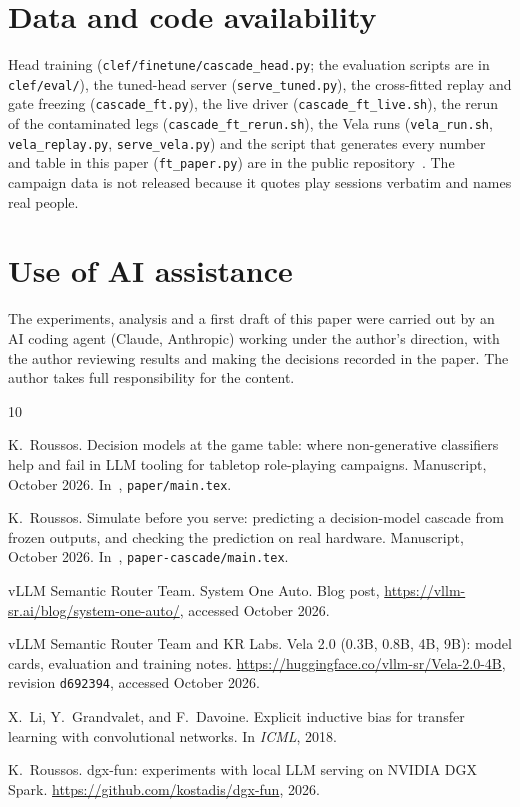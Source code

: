 \documentclass[11pt]{article}
\begin{document}
\section*{Data and code availability}
Head training (\texttt{clef/finetune/cascade\_head.py}; the evaluation scripts are in \texttt{clef/eval/}), the tuned-head server
(\texttt{serve\_tuned.py}), the cross-fitted replay and gate freezing
(\texttt{cascade\_ft.py}), the live driver (\texttt{cascade\_ft\_live.sh}), the
rerun of the contaminated legs (\texttt{cascade\_ft\_rerun.sh}), the Vela runs
(\texttt{vela\_run.sh}, \texttt{vela\_replay.py}, \texttt{serve\_vela.py}) and the script that generates every
number and table in this paper (\texttt{ft\_paper.py}) are in the public repository~\cite{dgxfun}. The campaign data is
not released because it quotes play sessions verbatim and names real people.

\section*{Use of AI assistance}
The experiments, analysis and a first draft of this paper were carried out by an AI coding agent
(Claude, Anthropic) working under the author's direction, with the author reviewing results and
making the decisions recorded in the paper. The author takes full responsibility for the content.


\begin{thebibliography}{10}

K.~Roussos.
\newblock Decision models at the game table: where non-generative classifiers help and fail in LLM
  tooling for tabletop role-playing campaigns.
\newblock Manuscript, October 2026. In~\cite{dgxfun}, \texttt{paper/main.tex}.

K.~Roussos.
\newblock Simulate before you serve: predicting a decision-model cascade from frozen outputs, and
  checking the prediction on real hardware.
\newblock Manuscript, October 2026. In~\cite{dgxfun}, \texttt{paper-cascade/main.tex}.

vLLM Semantic Router Team.
\newblock System One Auto.
\newblock Blog post, \url{https://vllm-sr.ai/blog/system-one-auto/}, accessed October 2026.

vLLM Semantic Router Team and KR Labs.
\newblock Vela 2.0 (0.3B, 0.8B, 4B, 9B): model cards, evaluation and training notes.
\newblock \url{https://huggingface.co/vllm-sr/Vela-2.0-4B}, revision \texttt{d692394}, accessed October 2026.

X.~Li, Y.~Grandvalet, and F.~Davoine.
\newblock Explicit inductive bias for transfer learning with convolutional networks.
\newblock In \emph{ICML}, 2018.

K.~Roussos.
\newblock dgx-fun: experiments with local LLM serving on NVIDIA DGX Spark.
\newblock \url{https://github.com/kostadis/dgx-fun}, 2026.

\end{thebibliography}
\end{document}
